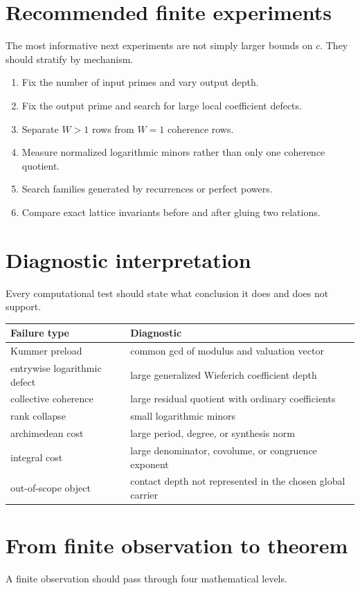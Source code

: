 \section{Recommended finite experiments}
The most informative next experiments are not simply larger bounds on $c$. They should stratify by mechanism.

\begin{enumerate}[leftmargin=1.5em]
\item Fix the number of input primes and vary output depth.
\item Fix the output prime and search for large local coefficient defects.
\item Separate $W>1$ rows from $W=1$ coherence rows.
\item Measure normalized logarithmic minors rather than only one coherence quotient.
\item Search families generated by recurrences or perfect powers.
\item Compare exact lattice invariants before and after gluing two relations.
\end{enumerate}

\section{Diagnostic interpretation}
Every computational test should state what conclusion it does and does not support.

\begin{longtable}{p{}p{}}
\toprule
Failure type & Diagnostic\\
\midrule
Kummer preload & common gcd of modulus and valuation vector\\
entrywise logarithmic defect & large generalized Wieferich coefficient depth\\
collective coherence & large residual quotient with ordinary coefficients\\
rank collapse & small logarithmic minors\\
archimedean cost & large period, degree, or synthesis norm\\
integral cost & large denominator, covolume, or congruence exponent\\
out-of-scope object & contact depth not represented in the chosen global carrier\\
\bottomrule
\end{longtable}

\section{From finite observation to theorem}
A finite observation should pass through four mathematical levels.

